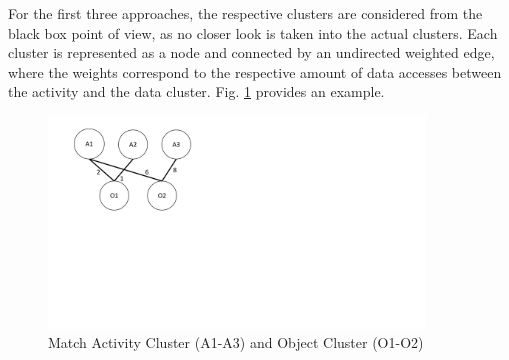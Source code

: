 \noindent
For the first three approaches, the respective clusters are considered from the black box point of view, as no closer look is taken into the actual clusters. Each cluster is represented as a node and connected by an undirected weighted edge, where the weights correspond to the respective amount of data accesses between the activity and the data cluster. Fig. \ref{fig:matchCluster} provides an example.\\

\begin{figure}[h!]
	\centering
	\includegraphics[width=10cm, trim={1.5cm 9.5cm 16.0cm 0cm}]{img/MatchCluster.pdf}
	\caption{Match Activity Cluster (A1-A3) and Object Cluster (O1-O2)}
	\label{fig:matchCluster}
\end{figure}

